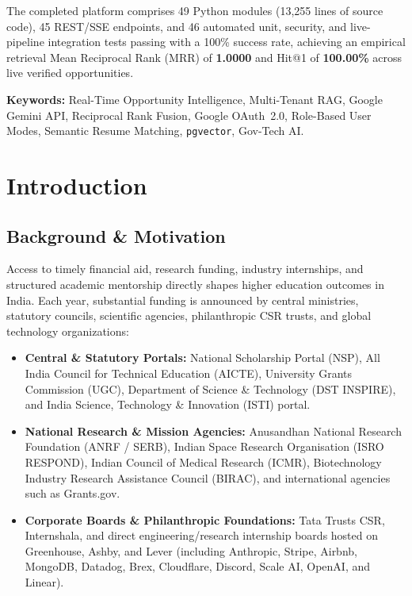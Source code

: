 \documentclass[12pt,a4paper,oneside]{report}
\begin{document}
The completed platform comprises 49 Python modules (13,255 lines of source code), 45 REST/SSE endpoints, and 46 automated unit, security, and live-pipeline integration tests passing with a 100\% success rate, achieving an empirical retrieval Mean Reciprocal Rank (MRR) of \textbf{1.0000} and Hit@1 of \textbf{100.00\%} across live verified opportunities.

\vspace{0.6cm}
\noindent \textbf{Keywords:} Real-Time Opportunity Intelligence, Multi-Tenant RAG, Google Gemini API, Reciprocal Rank Fusion, Google OAuth~2.0, Role-Based User Modes, Semantic Resume Matching, \texttt{pgvector}, Gov-Tech AI.

\tableofcontents
\listoffigures
\listoftables

\chapter{Introduction}

\section{Background \& Motivation}
Access to timely financial aid, research funding, industry internships, and structured academic mentorship directly shapes higher education outcomes in India. Each year, substantial funding is announced by central ministries, statutory councils, scientific agencies, philanthropic CSR trusts, and global technology organizations:
\begin{itemize}[itemsep=2pt]
    \item \textbf{Central \& Statutory Portals:} National Scholarship Portal (NSP), All India Council for Technical Education (AICTE), University Grants Commission (UGC), Department of Science \& Technology (DST INSPIRE), and India Science, Technology \& Innovation (ISTI) portal.
    \item \textbf{National Research \& Mission Agencies:} Anusandhan National Research Foundation (ANRF / SERB), Indian Space Research Organisation (ISRO RESPOND), Indian Council of Medical Research (ICMR), Biotechnology Industry Research Assistance Council (BIRAC), and international agencies such as Grants.gov.
    \item \textbf{Corporate Boards \& Philanthropic Foundations:} Tata Trusts CSR, Internshala, and direct engineering/research internship boards hosted on Greenhouse, Ashby, and Lever (including Anthropic, Stripe, Airbnb, MongoDB, Datadog, Brex, Cloudflare, Discord, Scale AI, OpenAI, and Linear).
\end{itemize}
\end{document}
